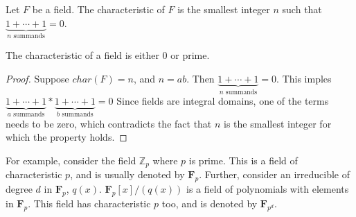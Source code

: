 \begin{definition} \label{def:char}
  Let $F$ be a field.
  The characteristic of $F$ is the smallest integer $n$ such that $\underbrace{1+\cdots+1}_{n \text{ summands}} = 0$.
\end{definition}
\begin{lemma} \label{lem:charprime}
  The characteristic of a field is either $0$ or prime.
\end{lemma}
\begin{proof} \label{proof:charprime}
  Suppose $char(F) = n$, and $n = ab$.
  Then $\underbrace{1+\cdots+1}_{n \text{ summands}} = 0$.
  This imples $\underbrace{1+\cdots+1}_{a \text{ summands}} * \underbrace{1+\cdots+1}_{b \text{ summands}} = 0$
  Since fields are integral domains, one of the terms needs to be zero, which contradicts the fact that $n$ is the smallest integer for which the property holds.
\end{proof}
For example, consider the field $\mathbb{Z}_{p}$ where $p$ is prime.
This is a field of characteristic $p$, and is usually denoted by $\mathbf{F}_{p}$.
Further, consider an irreducible of degree $d$ in $\mathbf{F}_{p}$, $q(x)$.
$\mathbf{F}_{p}[x] \big/ (q(x))$ is a field of polynomials with elements in $\mathbf{F}_{p}$.
This field has characteristic $p$ too, and is denoted by $\mathbf{F}_{p^{d}}$.
